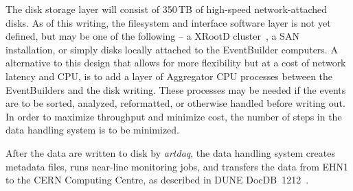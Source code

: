 The disk storage layer will consist of 350\,TB of high-speed
network-attached disks.  As of this writing, the filesystem and
interface software layer is not yet defined, but may be one of the
following --
a XRootD cluster~\cite{xrootd}, a SAN installation, or
simply disks locally attached to the EventBuilder computers.  A
alternative to this design that allows for more flexibility but at a
cost of network latency and CPU, is to add a layer of Aggregator CPU
processes between the EventBuilders and the disk writing.  These
processes may be needed if the events are to be sorted, analyzed,
reformatted, or otherwise handled before writing out.  In order to
maximize throughput and minimize cost, the number of steps in the data
handling system is to be minimized.

After the data are written to disk by {\it artdaq}, the data handling
system creates metadata files, runs near-line monitoring jobs, and
transfers the data from EHN1 to the CERN Computing Centre, as
described in DUNE DocDB~1212~\cite{docdb1212}.


